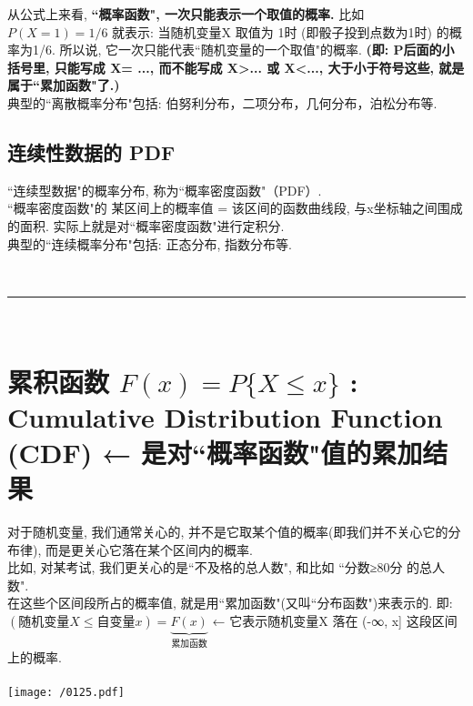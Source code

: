\documentclass[UTF8]{ctexart}
\begin{document}
从公式上来看, \textbf{``概率函数", 一次只能表示一个取值的概率.} 比如 $ P(X=1)= 1/6$ 就表示: 当随机变量X 取值为 1时 (即骰子投到点数为1时) 的概率为1/6. 所以说, 它一次只能代表``随机变量的一个取值"的概率. \textbf{(即: P后面的小括号里, 只能写成 X= ..., 而不能写成 X>... 或 X<..., 大于小于符号这些, 就是属于``累加函数"了.)}\\



典型的``离散概率分布"包括: 伯努利分布，二项分布，几何分布，泊松分布等. \\





\subsection{连续性数据的 PDF}

``连续型数据"的概率分布, 称为``概率密度函数"（PDF）.  \\


``概率密度函数"的 某区间上的概率值 = 该区间的函数曲线段, 与x坐标轴之间围成的面积. 实际上就是对``概率密度函数"进行定积分. \\


典型的``连续概率分布"包括: 正态分布, 指数分布等.



~\\
\hrule
~\\

\section{累积函数 $F(x)= P\{X \leq x\}$ : Cumulative Distribution Function (CDF)  ← 是对``概率函数"值的累加结果}

对于随机变量, 我们通常关心的, 并不是它取某个值的概率(即我们并不关心它的分布律), 而是更关心它落在某个区间内的概率.  \\
比如, 对某考试, 我们更关心的是``不及格的总人数", 和比如 ``分数≥80分 的总人数". \\

 在这些个区间段所占的概率值, 就是用``累加函数"(又叫``分布函数")来表示的. 即: \\
 $ (\text{随机变量}X\leq \text{自变量}x)=\underset{\text{累加函数}}{\underbrace{F(x)}}
$ ← 它表示随机变量X 落在 (-∞, x] 这段区间上的概率. \\
\vspace{1em} \\

\texttt{[image: /0125.pdf]} \\
\end{document}
